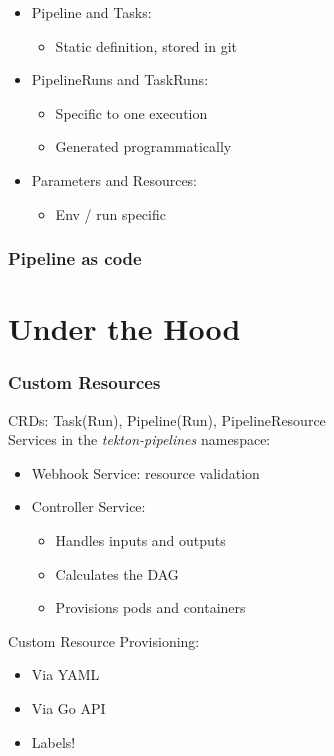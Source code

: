 \documentclass[aspectratio=169,11pt,hyperref={colorlinks=true}]{beamer}
\begin{document}
\begin{lblackrwhiteframe}
\begin{lblackrwhiteframe}
\begin{blackframe}
\begin{2columnsframe}
  {
  \begin{itemize}
    \item Pipeline and Tasks:
    \begin{itemize}
      \item Static definition, stored in git
    \end{itemize}
    \item PipelineRuns and TaskRuns:
    \begin{itemize}
      \item Specific to one execution
      \item Generated programmatically
    \end{itemize}
    \item Parameters and Resources:
    \begin{itemize}
      \item Env / run specific
    \end{itemize}
  \end{itemize}
  \vspace{0.3ex}
  
  }
  {
  
  \vspace{0.3ex}
  
  }
  \frametitle{Pipeline as code}
\end{2columnsframe}

\section{Under the Hood}

\begin{grayframe}
  \frametitle{Custom Resources}
  CRDs: Task(Run), Pipeline(Run), PipelineResource \\
  \vspace{3ex}
  Services in the {\em tekton-pipelines} namespace:
  \begin{itemize}
    \item Webhook Service: resource validation
    \item Controller Service:
    \begin{itemize}
      \item Handles inputs and outputs
      \item Calculates the DAG
      \item Provisions pods and containers
    \end{itemize}
  \end{itemize}
  \vspace{3ex}
  Custom Resource Provisioning:
  \begin{itemize}
    \item Via YAML
    \item Via Go API
    \item Labels!
  \end{itemize}
\end{grayframe}


\end{blackframe}
\end{lblackrwhiteframe}
\end{lblackrwhiteframe}
\end{document}
